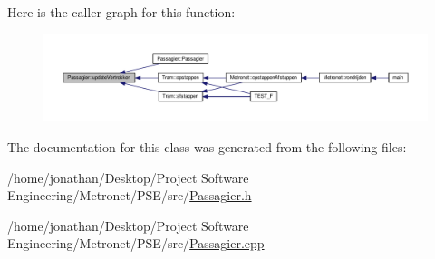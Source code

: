 Here is the caller graph for this function\+:
\nopagebreak
\begin{figure}[H]
\begin{center}
\leavevmode
\includegraphics[width=350pt]{class_passagier_aefbe5c6dfedf0bc10da44497d4a2e699_icgraph}
\end{center}
\end{figure}




The documentation for this class was generated from the following files\+:\begin{DoxyCompactItemize}
\item 
/home/jonathan/\+Desktop/\+Project Software Engineering/\+Metronet/\+P\+S\+E/src/\hyperlink{_passagier_8h}{Passagier.\+h}\item 
/home/jonathan/\+Desktop/\+Project Software Engineering/\+Metronet/\+P\+S\+E/src/\hyperlink{_passagier_8cpp}{Passagier.\+cpp}\end{DoxyCompactItemize}
